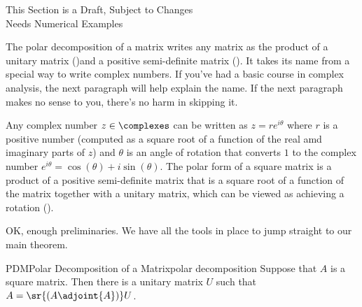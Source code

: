 %
{\sc\large This Section is a Draft, Subject to Changes}\\
{\sc\large Needs Numerical Examples}\par\bigskip
%
The polar decomposition of a matrix writes any matrix as the product of a unitary matrix ()and a positive semi-definite matrix ().  It takes its name from a special way to write complex numbers.  If you've had a basic course in complex analysis, the next paragraph will help explain the name.  If the next paragraph makes no sense to you, there's no harm in skipping it.\par
%
Any complex number $z\in\complexes$ can be written as $z=re^{i\theta}$ where $r$ is a positive number (computed as a square root of a function of the real amd imaginary parts of $z$) and $\theta$ is an angle of rotation that converts $1$ to the complex number $e^{i\theta}=\cos(\theta)+i\sin(\theta)$.  The polar form of a square matrix is a product of a positive semi-definite matrix that is a square root of a function of the matrix together with a unitary matrix, which can be viewed as achieving a rotation ().\par
%
OK, enough preliminaries.  We have all the tools in place to jump straight to our main theorem.
%
\begin{theorem}{PDM}{Polar Decomposition of a Matrix}{polar decomposition}
Suppose that $A$ is a square matrix.  Then there is a unitary matrix $U$ such that $A=\sr{\left(A\adjoint{A}\right)}U$.
\end{theorem}
%
